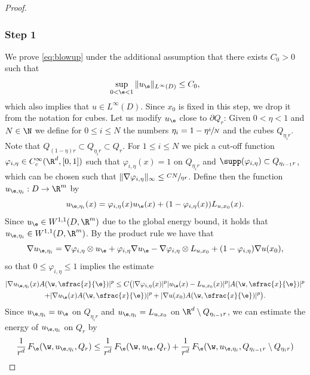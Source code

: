 \begin{proof}
\subsubsection*{Step 1} We prove \eqref{eq:blowup} under the additional assumption that there exists $C_0>0$ such that
\begin{equation}\label{eq:Lipschitz}
\sup_{0<\e<1}\|u_{\e}\|_{L^{\infty}(D)}\leq C_0,
\end{equation}
which also implies that $u\in L^{\infty}(D)$. Since $x_0$ is fixed in this step, we drop it from the notation for cubes. Let us modify $u_{\e}$ close to $\partial Q_r$: Given $0<\eta<1$ and $N\in\N$ we define for $0\leq i\leq N$ the numbers $\eta_i=1-\eta\sfrac{i}{N}$ and the cubes $Q_{\eta_i r}$. Note that $Q_{(1-\eta)r}\subset Q_{\eta_i r}\subset Q_r$. For $1\leq i\leq N$ we pick a cut-off function $\varphi_{i,\eta}\in C_c^{\infty}(\R^d,[0,1])$ such that $\varphi_{i,\eta}(x)=1$ on $Q_{\eta_i r}$ and $\supp (\varphi_{i,\eta})\subset Q_{\eta_{i-1}r}$, which can be chosen such that $\|\nabla\varphi_{i,\eta}\|_{\infty}\leq \sfrac{CN}{\eta r}$. Define then the function $u_{\e,\eta_i}:D\to\R^m$ by
\begin{equation*}
u_{\e,\eta_i}(x)=\varphi_{i,\eta}(x)u_{\e}(x)+(1-\varphi_{i,\eta}(x))L_{u,x_0}(x).
\end{equation*}
Since $u_{\e}\in W^{1,1}(D,\R^m)$ due to the global energy bound, it holds that $u_{\e,\eta_i}\in W^{1,1}(D,\R^m)$. By the product rule we have that
\begin{equation*}
\nabla u_{\e,\eta_i}=\nabla\varphi_{i,\eta}\otimes u_{\e}+\varphi_{i,\eta}\nabla u_{\e}-\nabla\varphi_{i,\eta}\otimes L_{u,x_0}+(1-\varphi_{i,\eta})\nabla u(x_0),
\end{equation*}
so that $0\leq \varphi_{i,\eta}\leq 1$ implies the estimate
\begin{multline}\label{eq:gradbound}
|\nabla u_{\e,\eta_i}(x)A(\w,\sfrac{x}{\e})|^p\leq C\bigl(|\nabla\varphi_{i,\eta}(x)|^p |u_{\e}(x)-L_{u,x_0}(x)|^p|A(\w,\sfrac{x}{\e})|^p
\\
+|\nabla u_{\e}(x)A(\w,\sfrac{x}{\e})|^p+|\nabla u(x_0)A(\w,\sfrac{x}{\e})|^p\bigr).
\end{multline}
Since $u_{\e,\eta_i}=u_{\e}$ on $Q_{\eta_i r}$ and $u_{\e,\eta_i}=L_{u,x_0}$ on $\R^d\setminus Q_{\eta_{i-1}r}$, we can estimate the energy of $u_{\e,\eta_i}$ on $Q_r$ by
\begin{multline}\label{eq:split}
\frac{1}{r^d}\,F_{\e}(\w,u_{\e,\eta_i},Q_r)\leq \frac{1}{r^d}\,F_{\e}(\w,u_{\e},Q_r)+\frac{1}{r^d}\,F_{\e}(\w,u_{\e,\eta_i},Q_{\eta_{i-1}r}\setminus Q_{\eta_i r})

\end{multline}
\end{proof}
